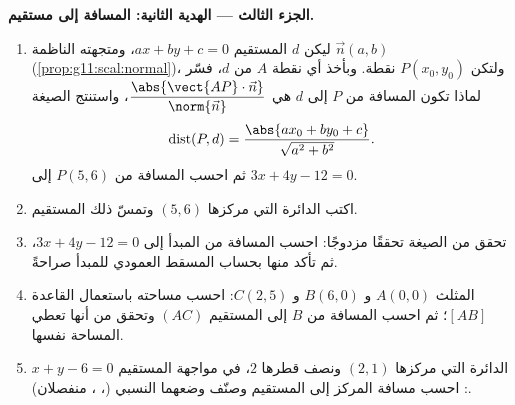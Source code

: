 \begin{problem}
\medskip
\noindent\textbf{الجزء الثالث --- الهدية الثانية: المسافة إلى
مستقيم.}
\begin{enumerate}[resume]
  \item ليكن $d$ المستقيم $ax + by + c = 0$، ومتجهته الناظمة
        $\vec n(a, b)$ (\cref{prop:g11:scal:normal})،
        ولتكن $P(x_0, y_0)$ نقطة. وبأخذ أي نقطة $A$ من $d$،
        فسّر لماذا تكون المسافة من $P$ إلى $d$ هي
        $\dfrac{\abs{\vect{AP} \cdot \vec n}}{\norm{\vec n}}$،
        واستنتج الصيغة
        \[
        \operatorname{dist}(P, d)
        = \frac{\abs{a x_0 + b y_0 + c}}{\sqrt{a^2 + b^2}} .
        \]
        ثم احسب المسافة من $P(5, 6)$ إلى
        $3x + 4y - 12 = 0$.
  \item اكتب  الدائرة التي مركزها $(5, 6)$
        وتمسّ ذلك المستقيم.
  \item تحقق من الصيغة تحققًا مزدوجًا: احسب المسافة من
        المبدأ إلى $3x + 4y - 12 = 0$، ثم تأكد منها
        بحساب المسقط العمودي للمبدأ
        صراحةً.
  \item المثلث $A(0,0)$ و $B(6,0)$ و $C(2,5)$: احسب مساحته
        باستعمال القاعدة $[AB]$؛ ثم احسب المسافة من
        $B$ إلى المستقيم $(AC)$ وتحقق من أنها تعطي المساحة
        نفسها.
  \item الدائرة التي مركزها $(2, 1)$ ونصف قطرها $2$، في مواجهة
        المستقيم $x + y - 6 = 0$: احسب مسافة المركز
        إلى المستقيم وصنّف وضعهما النسبي (،
        ، منفصلان).
\end{enumerate}


\end{problem}
